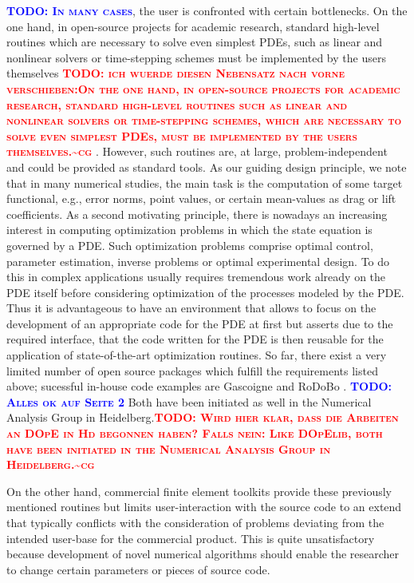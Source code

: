 \documentclass[prodmode,acmtoms]{acmsmall}
\numberwithin{equation}{section}
\newcommand{\todo}[1]{\textbf{\textsc{\textcolor{blue}{TODO: #1}}}}
\newcommand{\todocg}[1]{\textbf{\textsc{\textcolor{red}{TODO: #1\textasciitilde cg}}}}
\begin{document}
\todo{In many cases}, the user is confronted with 
certain bottlenecks. On the one hand, 
in open-source projects for academic research, 
standard high-level routines 
which are necessary to solve even simplest PDEs,
such as linear and nonlinear solvers or time-stepping schemes must be implemented 
by the users themselves \todocg{ich wuerde diesen Nebensatz nach vorne verschieben:On the one hand, 
in open-source projects for academic research, 
standard high-level routines such as linear and nonlinear solvers or time-stepping schemes,
which are necessary to solve even simplest PDEs,
must be implemented by the users themselves.} . However, such routines are, at large,
problem-independent and could be provided as standard tools. 
As our guiding design principle, we note that in many 
numerical studies, the main task is the computation of some  
target functional, e.g., error norms,
point values, or certain mean-values as drag or lift coefficients.
As a second motivating principle, 
there is nowadays an increasing interest in computing 
optimization problems in which the state equation is governed 
by a PDE. Such optimization problems comprise optimal control,
parameter estimation, inverse problems or optimal experimental design. 
To do this in complex applications usually requires tremendous work already
on the PDE itself before considering optimization of the processes modeled 
by the PDE. Thus it is advantageous to have an environment that allows to 
focus on the development of an appropriate code for the PDE at first but 
asserts due to the required interface, that the code written for the PDE
is then reusable for the application of state-of-the-art optimization 
routines.
So far, there exist a very limited number of open source packages
which fulfill the requirements listed above; 
sucessful in-house code examples are Gascoigne \cite{gascoigne}
and RoDoBo \cite{rodobo}. 
\todo{Alles ok auf Seite 2}
Both have been initiated as well in 
the Numerical Analysis Group in Heidelberg.\todocg{Wird hier klar, dass die Arbeiten an DOpE in Hd begonnen haben? Falls nein: Like DOpElib, both have been initiated in the Numerical Analysis Group in Heidelberg.}

On the other hand, commercial finite element toolkits provide these 
previously mentioned routines but limits user-interaction
with the source code to an extend that typically conflicts
with the consideration of problems deviating from the intended 
user-base for the commercial product. 
This is quite unsatisfactory because development of novel numerical 
algorithms should enable the researcher
to change certain parameters or pieces of source code. 
\end{document}
